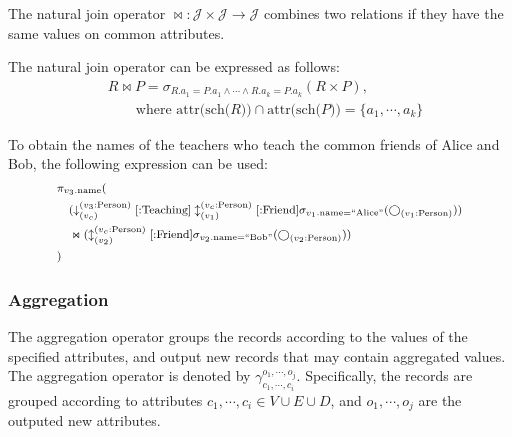 \begin{definition}
    The natural join operator $\Join : \mathcal{J} \times \mathcal{J} \rightarrow \mathcal{J}$ combines two relations if they have the same values on common attributes.
\end{definition}

The natural join operator can be expressed as follows:
\begin{equation*}
    \begin{split}
        & R \Join P = \sigma_{R.a_1 = P.a_1 \land \cdots \land R.a_k = P.a_k}(R \times P), \\
        & \hspace{2em} \text{where } \text{attr(sch($R$))} \cap \text{attr(sch($P$))} = \{a_1, \cdots, a_k\}
    \end{split}
\end{equation*}

\begin{example}
    To obtain the names of the teachers who teach the common friends of Alice and Bob, the following expression can be used:
    \begin{equation*}
        \footnotesize
        \begin{split}
            & \pi_{v_3\text{.name}}( \\
            & \hspace{1em} (\downarrow_{(v_c)}^{(v_3\text{:Person})}[\text{:Teaching}]\updownarrow_{(v_1)}^{(v_c\text{:Person})}[\text{:Friend}]\sigma_{v_1\text{.name=``Alice''}}(\bigcirc_{(v_1\text{:Person})})) \\
            & \hspace{1em} \Join (\updownarrow_{(v_2)}^{(v_c\text{:Person})}[\text{:Friend}]\sigma_{v_2\text{.name=``Bob''}}(\bigcirc_{(v_2\text{:Person})}))\\
            & )
        \end{split}
    \end{equation*}
\end{example}

\subsubsection{Aggregation}
The aggregation operator groups the records according to the values of the specified attributes, and output new records that may contain aggregated values.
The aggregation operator is denoted by $\gamma_{c_1, \cdots, c_i}^{o_1, \cdots, o_j}$.
Specifically, the records are grouped according to attributes $c_1, \cdots, c_i \in V \cup E \cup D$, and $o_1, \cdots, o_j$ are the outputed new attributes.

